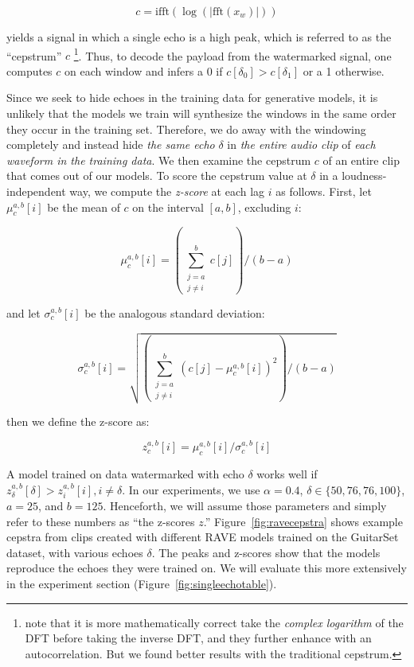 \documentclass[letterpaper]{article} %
\begin{document}
\begin{equation}
    \label{eq:cepstrum}
    c = \text{ifft} ( \log ( | \text{fft} (x_w) | ) )
\end{equation}
 
yields a signal in which a single echo is a high peak, which is referred to as the ``cepstrum'' $c$ \footnote{\cite{gruhl1996echo} note that it is more mathematically correct take the {\em complex logarithm} of the DFT before taking the inverse DFT, and they further enhance with an autocorrelation.  But we found better results with the traditional cepstrum.}.  Thus, to decode the payload from the watermarked signal, one computes $c$ on each window and infers a 0 if $c[\delta_0] > c[\delta_1]$ or a 1 otherwise.

Since we seek to hide echoes in the training data for generative models, it is unlikely that the models we train will synthesize the windows in the same order they occur in the training set.  Therefore, we do away with the windowing completely and instead hide {\em the same echo} $\delta$ in {\em the entire audio clip} of {\em each waveform in the training data}.  We then examine the cepstrum $c$ of an entire clip that comes out of our models.  To score the cepstrum value at $\delta$ in a loudness-independent way, we compute the {\em z-score} at each lag $i$ as follows.  First, let $\mu_{c}^{a,b}[i]$ be the mean of $c$ on the interval $[a, b]$, excluding $i$:

\begin{equation}
    \mu_{c}^{a,b}[i] = \left( \sum_{\substack{j=a \\ j \neq i}}^{b} c[j] \right) / (b-a)
\end{equation}

and let $\sigma_{c}^{a,b}[i]$ be the analogous standard deviation:

\begin{equation}
    \sigma_{c}^{a,b}[i] = \sqrt{ \left( \sum_{\substack{j=a \\ j \neq i}}^{b} (c[j] - \mu_c^{a,b}[i])^2 \right) / (b-a)}
\end{equation}

then we define the z-score as:

\begin{equation}
    \label{eq:zscore}
    z_{c}^{a,b}[i] = \mu_{c}^{a,b}[i] / \sigma_{c}^{a,b}[i]
\end{equation}


A model trained on data watermarked with echo $\delta$ works well if $z^{a,b}_{\delta}[\delta] > z^{a,b}_{i}[i], i \neq \delta$.  In our experiments, we use $\alpha = 0.4$, $\delta \in \{50, 76, 76, 100\}$, $a=25$, and $b=125$.  Henceforth, we will assume those parameters and simply refer to these numbers as ``the z-scores $z$.''  Figure~\ref{fig:ravecepstra} shows example cepstra from clips created with different RAVE\cite{caillon2021rave} models trained on the GuitarSet \cite{xi2018guitarset} dataset, with various echoes $\delta$.  The peaks and z-scores show that the models reproduce the echoes they were trained on.  We will evaluate this more extensively in the experiment section (Figure~\ref{fig:singleechotable}).
\end{document}
